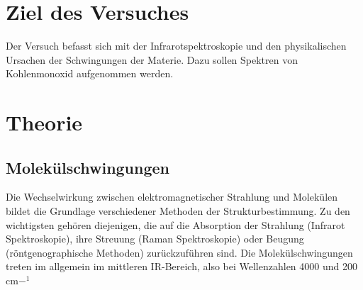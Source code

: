 \documentclass[12pt]{article}
\begin{document}
\section{Ziel des Versuches}
Der Versuch befasst sich mit der Infrarotspektroskopie und den physikalischen Ursachen der Schwingungen der Materie.
Dazu sollen Spektren von Kohlenmonoxid aufgenommen werden.
\section{Theorie}\cite{fadini}
\subsection{Molekülschwingungen}
Die Wechselwirkung zwischen elektromagnetischer Strahlung und Molekülen
bildet die Grundlage verschiedener Methoden der Strukturbestimmung. Zu den wichtigsten
gehören diejenigen, die auf die Absorption der Strahlung (Infrarot Spektroskopie),
ihre Streuung (Raman Spektroskopie) oder Beugung (röntgenographische Methoden)
zurückzuführen sind.
Die Molekülschwingungen treten im allgemein im mittleren IR-Bereich,
also bei Wellenzahlen 4000 und 200 cm$-^1$
\end{document}
